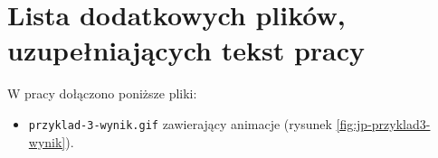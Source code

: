 \chapter{Lista dodatkowych plików, uzupełniających tekst pracy} 

W pracy dołączono poniższe pliki: 
\begin{itemize}
    \item \verb|przyklad-3-wynik.gif| zawierający animacje (rysunek \ref{fig:jp-przyklad3-wynik}).
\end{itemize}
